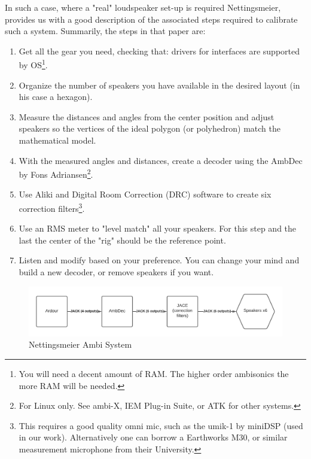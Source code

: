In such a case, where a "real" loudspeaker set-up is required Nettingsmeier, provides us with a good description of the associated steps required to calibrate such a system. Summarily, the steps in that paper are:

\begin{enumerate}
    \item Get all the gear you need, checking that: drivers for interfaces are supported by OS\footnote{You will need a decent amount of RAM. The higher order ambisonics the more RAM will be needed.}.
    \item Organize the number of speakers you have available in the desired layout (in his case a hexagon). 
    \item Measure the distances and angles from the center position and adjust speakers so the vertices of the ideal polygon (or polyhedron) match the mathematical model.  
    \item With the measured angles and distances, create a decoder using the AmbDec by Fons Adriansen\footnote{For Linux only. See ambi-X, IEM Plug-in Suite, or ATK for other systems.}.
    \item Use Aliki and Digital Room Correction (DRC) software to create six correction filters\footnote{This requires a good quality omni mic, such as the umik-1 by miniDSP (used in our work). Alternatively one can borrow a Earthworks M30, or similar measurement microphone from their University.}.
    \item Use an RMS meter to "level match" all your speakers. For this step and the last the center of the "rig" should be the reference point. 
    \item Listen and modify based on your preference. You can change your mind and build a new decoder, or remove speakers if you want. 
\end{enumerate}

\begin{figure}[ht]%
\centering
\includegraphics[width=1.0\textwidth]{img/nettingsmeier-extra-frontal.png} 
\caption{Nettingsmeier Ambi System}
\label{fig:extra-frontal}
\end{figure}

